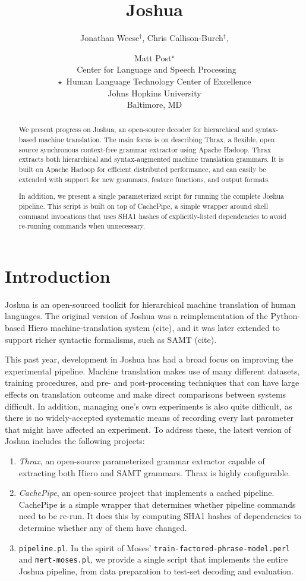 \documentclass[11pt]{article}
\title{Joshua}
\author{Jonathan Weese${}^\dag$, Chris Callison-Burch${}^\dag$, \and Matt Post${}^\star$ \\
\textdagger\ Center for Language and Speech Processing \\
$\star$\ Human Language Technology Center of Excellence \\
Johns Hopkins University \\
Baltimore, MD}
\date{}
\begin{document}
\maketitle

\begin{abstract}
We present progress on Joshua, an open-source decoder for hierarchical
and syntax-based machine translation.  The main focus
is on describing Thrax, a flexible, open source synchronous
context-free grammar extractor using Apache Hadoop.  Thrax extracts
both hierarchical \cite{Chiang2007} and syntax-augmented machine
translation \cite{samt2006} grammars.  It is built on Apache Hadoop for efficient
distributed performance, and can easily be extended with
support for new grammars, feature functions, and output formats.  

In addition, we present a single parameterized script for running the
complete Joshua pipeline.  This script is built on top of CachePipe, a
simple wrapper around shell command invocations that uses SHA1 hashes
of explicitly-listed dependencies to avoid re-running commands when
unnecessary.
\end{abstract}

\section{Introduction}

Joshua is an open-sourced toolkit for hierarchical machine translation
of human languages.  The original version of Joshua was a
reimplementation of the Python-based Hiero machine-translation system
(cite), and it was later extended to support richer syntactic
formalisms, such as SAMT (cite).

This past year, development in Joshua has had a broad focus on
improving the experimental pipeline.  Machine translation makes
use of many different datasets, training procedures, and pre- and
post-processing techniques that can have large effects on translation
outcome and make direct comparisons between systems difficult.  In addition,
managing one's own experiments is also quite difficult, as there is no
widely-accepted systematic means of recording every last parameter
that might have affected an experiment.  To address these, the latest
version of Joshua includes the following projects:

\begin{enumerate}
\item \emph{Thrax}, an open-source parameterized grammar extractor
  capable of extracting both Hiero and SAMT grammars.  Thrax is highly
  configurable.
\item \emph{CachePipe}, an open-source project that implements a cached
  pipeline.  CachePipe is a simple wrapper that determines whether
  pipeline commands need to be re-run.  It does this by computing SHA1
  hashes of dependencies to determine whether any of them have changed.
\item \verb|pipeline.pl|.  In the spirit of Moses'
  \verb|train-factored-phrase-model.perl| and \verb|mert-moses.pl|, we
  provide a single script that implements the entire Joshua pipeline,
  from data preparation to test-set decoding and evaluation.
\end{enumerate}
\end{document}
